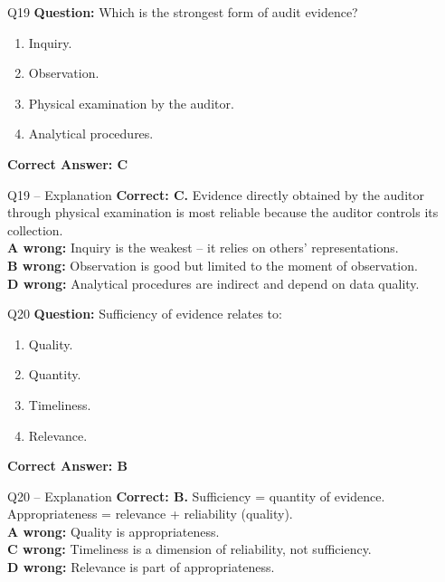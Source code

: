 \documentclass[aspectratio=169,10pt]{beamer}
\begin{document}
	\begin{frame}[t]{Q19}
		\small
		\textbf{Question:} Which is the strongest form of audit evidence?
		\begin{enumerate}[label=\Alph*.,itemsep=1pt,topsep=2pt]
			\item Inquiry.
			\item Observation.
			\item Physical examination by the auditor.
			\item Analytical procedures.
		\end{enumerate}
		\vspace{4pt}
		\textbf{Correct Answer: C}
	\end{frame}
	
	\begin{frame}[t]{Q19 -- Explanation}
		\small
		\textbf{Correct: C.} Evidence directly obtained by the auditor through physical examination is most reliable because the auditor controls its collection. \\[4pt]
		\textbf{A wrong:} Inquiry is the weakest -- it relies on others' representations. \\[2pt]
		\textbf{B wrong:} Observation is good but limited to the moment of observation. \\[2pt]
		\textbf{D wrong:} Analytical procedures are indirect and depend on data quality.
	\end{frame}
	
	\begin{frame}[t]{Q20}
		\small
		\textbf{Question:} Sufficiency of evidence relates to:
		\begin{enumerate}[label=\Alph*.,itemsep=1pt,topsep=2pt]
			\item Quality.
			\item Quantity.
			\item Timeliness.
			\item Relevance.
		\end{enumerate}
		\vspace{4pt}
		\textbf{Correct Answer: B}
	\end{frame}
	
	\begin{frame}[t]{Q20 -- Explanation}
		\small
		\textbf{Correct: B.} Sufficiency = quantity of evidence. Appropriateness = relevance + reliability (quality). \\[4pt]
		\textbf{A wrong:} Quality is appropriateness. \\[2pt]
		\textbf{C wrong:} Timeliness is a dimension of reliability, not sufficiency. \\[2pt]
		\textbf{D wrong:} Relevance is part of appropriateness.
	\end{frame}
	
\end{document}
